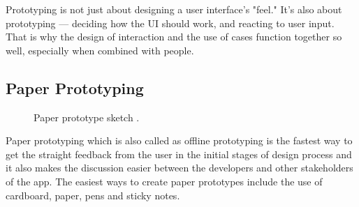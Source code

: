 Prototyping is not just about designing a user interface's "feel." It's also about prototyping — deciding how the \acs{UI} should work, and reacting to user input. That is why the design of interaction and the use of cases function together so well, especially when combined with people.\citep{Stephens2006PersonaAnalysis}

\subsection{Paper Prototyping}

\begin{figure}[hbt!] 
  \centering
  \qquad
  \caption[Paper prototype sketch ]{Paper prototype sketch .}
  \label{fig:Paper_proto}
\end{figure}
Paper prototyping which is also called as offline prototyping is the fastest way to get the straight feedback from the user in the initial stages of design process and it also makes the discussion easier between the developers and other stakeholders of the app. The easiest ways to create paper prototypes include the use of cardboard, paper, pens and sticky notes.\citep{Bansemir2014ExperienceVisualizations}

